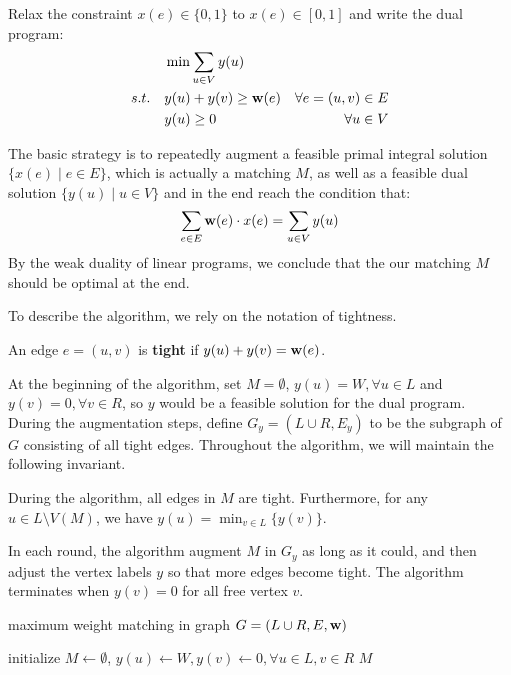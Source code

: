 Relax the constraint $x(e)\in \{0, 1\}$ to $x(e)\in [0, 1]$ and write the dual program:
$$\begin{aligned}
	&\min \sum_{u\in V}y(u)\\
	s.t.\quad &	y(u) + y(v)\geq \mathbf{w}(e)	&\forall e = (u, v)\in E\\
	&	y(u)\geq 0	&\forall u\in V
\end{aligned}$$

The basic strategy is to repeatedly augment a feasible primal integral solution $\{x(e)\mid e\in E\}$, which is actually a matching $M$, as well as a feasible dual solution $\{y(u)\mid u\in V\}$ and in the end reach the condition that:
$$\sum_{e\in E}\mathbf{w}(e)\cdot x(e) = \sum_{u\in V}y(u)$$
By the weak duality of linear programs, we conclude that the our matching $M$ should be optimal at the end.

To describe the algorithm, we rely on the notation of tightness.
\begin{definition}
	An edge $e = (u, v)$ is \textbf{tight} if $y(u) + y(v) = \mathbf{w}(e)$.
\end{definition}
At the beginning of the algorithm, set $M = \emptyset$, $y(u) = W,\forall u\in L$ and $y(v) = 0, \forall v\in R$, so $y$ would be a feasible solution for the dual program. During the augmentation steps, define $G_y = (L\cup R, E_y)$ to be the subgraph of $G$ consisting of all tight edges. Throughout the algorithm, we will maintain the following invariant.

\begin{invariant}\label{match-tight}
	During the algorithm, all edges in $M$ are tight. Furthermore, for any $u\in L\setminus V(M)$, we have $y(u) = \min_{v\in L}\{y(v)\}$.
\end{invariant}
In each round, the algorithm augment $M$ in $G_y$ as long as it could, and then adjust the vertex labels $y$ so that more edges become tight. The algorithm terminates when $y(v) = 0$ for all free vertex $v$.

\begin{algorithm}
	\caption{maximum weight matching in graph $G = (L\cup R, E, \mathbf{w})$}\label{hungarian}
	initialize $M \leftarrow \emptyset$, $y(u) \leftarrow W, y(v)\leftarrow 0, \forall u\in L, v\in R$\;
	\Return $M$\;
\end{algorithm}


